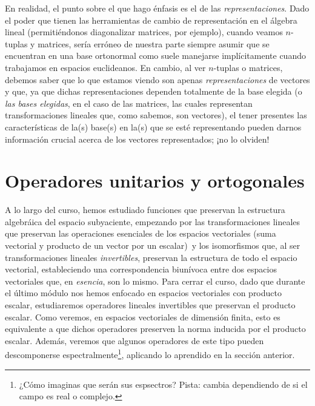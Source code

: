 \documentclass[12pt,libertine]{book}
\begin{document}
\begin{tcolorbox}
\vspace{3mm}
\hspace{2.5mm} En realidad, el punto sobre el que hago énfasis es el de las \emph{representaciones}. Dado el poder que tienen las herramientas de cambio de representación en el álgebra lineal (permitiéndonos diagonalizar matrices, por ejemplo), cuando veamos $n$-tuplas y matrices, sería erróneo de nuestra parte siempre asumir que se encuentran en una base ortonormal \textemdash como suele manejarse implícitamente cuando trabajamos en espacios euclideanos. En cambio, al ver $n$-tuplas o matrices, debemos saber que lo que estamos viendo son apenas \emph{representaciones} de vectores y que, ya que dichas representaciones dependen totalmente de la base elegida (o \emph{las bases elegidas}, en el caso de las matrices, las cuales representan transformaciones lineales que, como sabemos, son vectores), el tener presentes las características de la(s) base(s) en la(s) que se esté representando pueden darnos información crucial acerca de los vectores representados; ¡no lo olviden!
\end{tcolorbox}

\newpage
\section{Operadores unitarios y ortogonales} \label{Sec:16} 

A lo largo del curso, hemos estudiado funciones que preservan la estructura algebráica del espacio subyaciente, empezando por las transformaciones lineales \textemdash que preservan las operaciones esenciales de los espacios vectoriales (suma vectorial y producto de un vector por un escalar)\textemdash \ y los isomorfismos \textemdash que, al ser transformaciones lineales \emph{invertibles}, preservan la estructura de todo el espacio vectorial, estableciendo una correspondencia biunívoca entre dos espacios vectoriales que, en \emph{esencia}, son lo mismo. Para cerrar el curso, dado que durante el último módulo nos hemos enfocado en espacios vectoriales con producto escalar, estudiaremos operadores lineales invertibles que preservan el producto escalar. Como veremos, en espacios vectoriales de dimensión finita, esto es equivalente a que dichos operadores preserven la norma inducida por el producto escalar. Además, veremos que algunos operadores de este tipo pueden descomponerse espectralmente\footnote{¿Cómo imaginas que serán sus espsectros? Pista: cambia dependiendo de si el campo es real o complejo.}, aplicando lo aprendido en la sección anterior.
\end{document}
